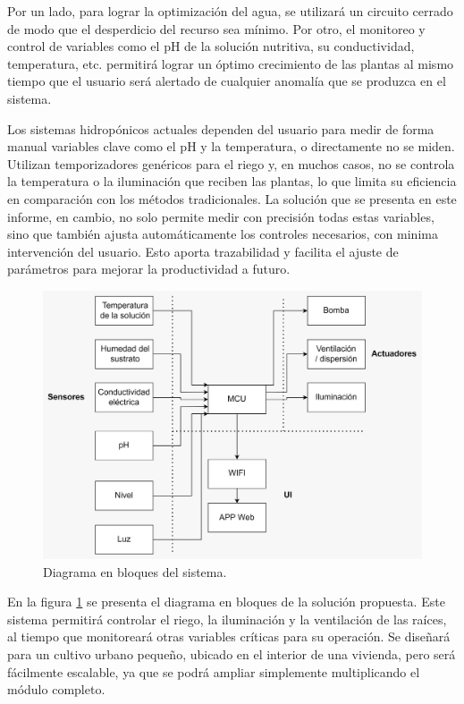 \documentclass[
11pt, %
]{charter}
\begin{document}
Por un lado, para lograr  la optimización del agua, se utilizará un circuito cerrado de modo que el desperdicio del recurso sea mínimo. Por otro, el monitoreo y control de variables como el pH de la solución nutritiva, su conductividad, temperatura, etc. permitirá lograr un óptimo crecimiento de las plantas al mismo tiempo que el usuario será alertado de cualquier anomalía que se produzca en el sistema.

Los sistemas hidropónicos actuales dependen del usuario para medir de forma manual variables clave como el pH y la temperatura, o directamente no se miden. Utilizan temporizadores genéricos para el riego y, en muchos casos, no se controla la temperatura o la iluminación que reciben las plantas, lo que limita su eficiencia en comparación con los métodos tradicionales. La solución que se presenta en este informe, en cambio, no solo permite medir con precisión todas estas variables, sino que también ajusta automáticamente los controles necesarios, con minima intervención del usuario. Esto aporta trazabilidad y facilita el ajuste de parámetros para mejorar la productividad a futuro.

\begin{figure}[htpb]
\centering 
\includegraphics[width=.85\textwidth]{./Figuras/d_bloques.png}
\caption{Diagrama en bloques del sistema.}
\label{fig:d_bloques}
\end{figure}

En la figura \ref{fig:d_bloques} se presenta el diagrama en bloques de la solución propuesta. Este sistema permitirá controlar el riego, la iluminación y la ventilación de las raíces, al tiempo que monitoreará otras variables críticas para su operación. Se diseñará para un cultivo urbano pequeño, ubicado en el interior de una vivienda, pero será fácilmente escalable, ya que se podrá ampliar simplemente multiplicando el módulo completo. 
\end{document}
